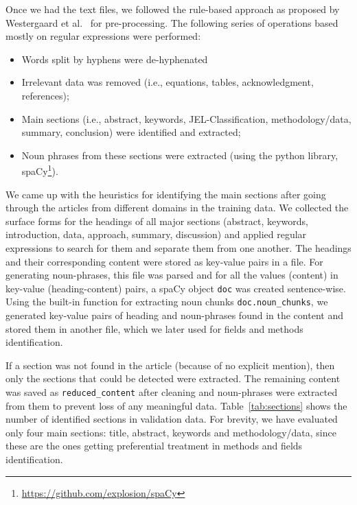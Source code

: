 \documentclass[runningheads]{llncs}
\begin{document}
	\smallskip
	
	Once we had the text files, we followed the rule-based approach as proposed by Westergaard et al.~\cite{DBLP:journals/ploscb/WestergaardSTJB18} for pre-processing. The following series of operations based mostly on regular expressions were performed:
	\begin{itemize}
		\item Words split by hyphens were de-hyphenated %
		\item Irrelevant data was removed (i.e., equations, tables, acknowledgment, references);
		\item \raggedright Main sections (i.e., abstract, keywords,
		JEL-Classification, methodology/data, summary, conclusion) were identified and extracted;
		\item Noun phrases from these sections were extracted (using the python library, spaCy\footnote{\url{https://github.com/explosion/spaCy}}).
	\end{itemize}
	
	We came up with the heuristics for identifying the main sections after going through the articles from different domains in the training data. We collected the surface forms for the headings of all major sections (abstract, keywords, introduction, data, approach, summary, discussion) and applied regular expressions to search for them and separate them from one another. The headings and their corresponding content were stored as key-value pairs in a file. %
	For generating noun-phrases, this file was parsed and for all the values (content) in key-value (heading-content) pairs, a spaCy object \texttt{doc} was created sentence-wise. Using the built-in function for extracting noun chunks {\texttt{doc.noun\_chunks}}, we generated key-value pairs of heading and noun-phrases found in the content and stored them in another file, which we later used for fields and methods identification.
	
	If a section was not found in the article (because of no explicit mention), then only the sections that could be detected were extracted. The remaining content was saved as \texttt{reduced\_content} after cleaning and noun-phrases were extracted from them to prevent loss of any meaningful data. Table~\ref{tab:sections} shows the number of identified sections in validation data. For brevity, we have evaluated only four main sections: title, abstract, keywords and methodology/data, since these are the ones getting preferential treatment in methods and fields identification.  
	
\end{document}
